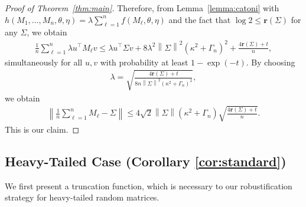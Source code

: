 \documentclass[11pt,a4paper]{article}
\theoremstyle{remark}
\theoremstyle{definition}
\theoremstyle{definition}
\begin{document}
\begin{bibunit}[apalike]
\begin{proof}[Proof of Theorem~\ref{thm:main}]
Therefore, from Lemma~\ref{lemma:catoni} with $h\left(M_{1},\ldots,M_{n},\theta,\eta\right)=\lambda\sum_{\ell=1}^{n}f\left(M_{\ell},\theta,\eta\right)$ and the fact that $\log2\le\mathbf{r}\left(\Sigma\right)$ for any $\Sigma$, we obtain
\begin{align*}
    \frac{1}{n}\sum_{\ell=1}^{n}\lambda u^{\top}M_{\ell}v\le \lambda u^{\top}\Sigma v+8\lambda^{2}\left\|\Sigma\right\|^{2}\left(\kappa^{2}+\Gamma_{n}\right)^{2}+\frac{4\mathbf{r}\left(\Sigma\right)+t}{n},
\end{align*}
simultaneously for all $u,v$ with probability at least $1-\exp(-t)$.
By choosing 
\begin{align*}
    \lambda=\sqrt{\frac{4\mathbf{r}\left(\Sigma\right)+t}{8n\left\|\Sigma\right\|^{2}\left(\kappa^{2}+\Gamma_{n}\right)^{2}}},
\end{align*}
we obtain
\begin{align*}
    \left\|\frac{1}{n}\sum_{\ell=1}^{n} M_{\ell}-\Sigma\right\|\le4\sqrt{2}\left\|\Sigma\right\|\left(\kappa^{2}+\Gamma_{n}\right)\sqrt{\frac{4\mathbf{r}\left(\Sigma\right)+t}{n}}.
\end{align*}
This is our claim.
\end{proof}

\subsection{Heavy-Tailed Case (Corollary \ref{cor:standard})}
\label{subsub:truncation}

We first present a truncation function, which is necessary to our robustification strategy for heavy-tailed random matrices.


\end{bibunit}
\end{document}
